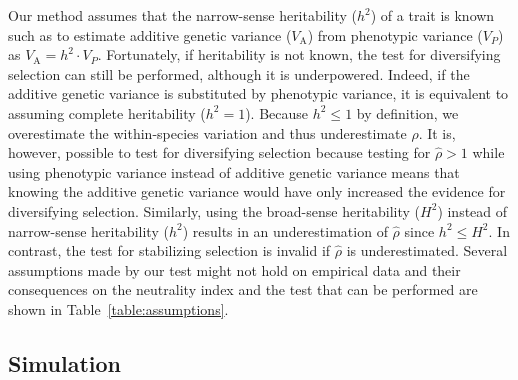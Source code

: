 \documentclass{article}
\newcommand{\Multiply}{\cdot}
\newcommand{\Trait}{P}
\newcommand{\Heritability}{h^2}
\newcommand{\VarPhenotype}{V_{\Trait}}
\newcommand{\VarGenetic}{V_{\mathrm{A}}}
\newcommand{\EstNI}{\widehat{\rho}}
\begin{document}
Our method assumes that the narrow-sense heritability ($\Heritability$) of a trait is known such as to estimate additive genetic variance ($\VarGenetic$) from phenotypic variance ($\VarPhenotype$) as $\VarGenetic = \Heritability \Multiply \VarPhenotype$.
Fortunately, if heritability is not known, the test for diversifying selection can still be performed, although it is underpowered.
Indeed, if the additive genetic variance is substituted by phenotypic variance, it is equivalent to assuming complete heritability ($\Heritability = 1$).
Because $\Heritability \leq 1$ by definition, we overestimate the within-species variation and thus underestimate $\EstNI$.
It is, however, possible to test for diversifying selection because testing for $\EstNI > 1$ while using phenotypic variance instead of additive genetic variance means that knowing the additive genetic variance would have only increased the evidence for diversifying selection.
Similarly, using the broad-sense heritability ($H^2$) instead of narrow-sense heritability ($\Heritability$) results in an underestimation of $\EstNI$ since $\Heritability \leq H^2$.
In contrast, the test for stabilizing selection is invalid if $\EstNI$ is underestimated.
Several assumptions made by our test might not hold on empirical data and their consequences on the neutrality index and the test that can be performed are shown in Table~\ref{table:assumptions}.

\subsection*{Simulation}\label{subsec:simulations}
\end{document}
